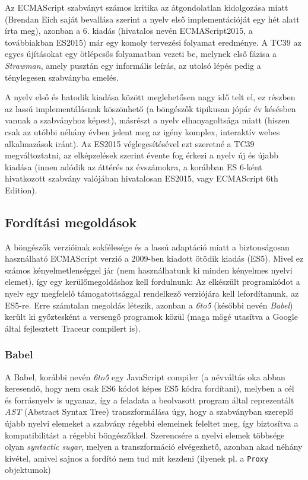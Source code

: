 Az ECMAScript szabványt számos kritika az átgondolatlan kidolgozása miatt
(Brendan Eich saját bevallása szerint a nyelv első implementációját egy hét
alatt írta meg), azonban a 6. kiadás (hivatalos nevén ECMAScript2015, a
továbbiakban ES2015) már egy komoly tervezési folyamat eredménye.  A TC39 az
egyes újításokat egy ötlépcsős folyamatban vezeti be, melynek első fázisa a
\emph{Strawman}, amely pusztán egy informális leírás, az utolsó lépés pedig a
ténylegesen szabványba emelés.

A nyelv első és hatodik kiadása között meglehetősen nagy idő telt el, ez részben
az lassú implementálásnak köszönhető (a böngészők tipikusan jópár év késésben
vannak a szabványhoz képest), másrészt a nyelv elhanyagoltsága miatt (hiszen
csak az utóbbi néhány évben jelent meg az igény komplex, interaktív webes
alkalmazások iránt). Az ES2015 véglegesítésével ezt szeretné a TC39
megváltoztatni, az elképzelések szerint évente fog érkezi a nyelv új és újabb
kiadása (innen adódik az áttérés az évszámokra, a korábban ES 6-ként hivatkozott
szabvány valójában hivatalosan ES2015, vagy ECMAScript 6th Edition).

\subsection{Fordítási megoldások}

A böngészők verzióinak sokfélesége és a lassú adaptáció miatt a biztonságosan
használható ECMAScript verzió a 2009-ben kiadott ötödik kiadás (ES5).  Mivel ez
számos kényelmetlenséggel jár (nem használhatunk ki minden kényelmes nyelvi
elemet), így egy kerülőmegoldáshoz kell fordulnunk: Az elkészült programkódot a
nyelv egy megfelelő támogatottsággal rendelkező verziójára kell lefordítanunk,
az ES5-re.  Erre számtalan megoldás létezik, azonban a \emph{6to5} (későbbi
nevén \emph{Babel}) került ki győztesként a versengő programok közül (maga mögé
utasítva a Google által fejlesztett Traceur compilert is).

\subsubsection{Babel}

A Babel, korábbi nevén \emph{6to5} egy JavaScript compiler (a névváltás oka
abban keresendő, hogy nem csak ES6 kódot képes ES5 kódra fordítani), melyben a
cél és forrásnyelv is ugyanaz, így a feladata a beolvasott program által
reprezentált \emph{AST} (Abstract Syntax Tree) transzformálása úgy, hogy a
szabványban szereplő újabb nyelvi elemeket a szabvány régebbi elemeinek feleltet
meg, így biztosítva a kompatibilitást a régebbi böngészőkkel. Szerencsére a
nyelvi elemek többsége olyan \emph{syntactic sugar}, melyen a transzformáció
elvégezhető, azonban akad néhány kivétel, amivel sajnos a fordító nem tud mit
kezdeni (ilyenek pl. a \texttt{Proxy} objektumok)

